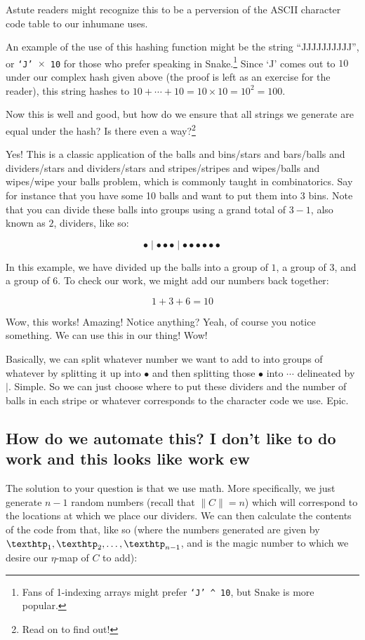 \documentclass{article}
\newcommand{\M}{\rotatebox[origin=c]{180}{\textwon}}
\begin{document}
\begin{multicols}{2}
Astute readers might recognize this to be a perversion of the ASCII character code table to our inhumane uses.

	An example of the use of this hashing function might be the string ``JJJJJJJJJJ'', or \texttt{`J' $\times$ 10} for those who prefer speaking in Snake.\footnote{Fans of 1-indexing arrays might prefer \texttt{`J' \textasciicircum \hspace{0.25em} 10}, but Snake is more popular.} Since `J' comes out to $10$ under our complex hash given above (the proof is left as an exercise for the reader), this string hashes to $10 + \cdots + 10 = 10 \times 10 = 10^2 = 100$. 

Now this is well and good, but how do we ensure that all strings we generate are equal under the hash? Is there even a way?\footnote{Read on to find out!} 

Yes! This is a classic application of the balls and bins/stars and bars/balls and dividers/stars and dividers/stars and stripes/stripes and wipes/balls and wipes/wipe your balls problem, which is commonly taught in combinatorics. Say for instance that you have some 10 balls and want to put them into 3 bins. Note that you can divide these balls into groups using a grand total of $3-1$, also known as $2$, dividers, like so:

$$\bullet \mid \bullet \bullet \bullet \mid \bullet \bullet \bullet \bullet \bullet \bullet$$

In this example, we have divided up the balls into a group of $1$, a group of $3$, and a group of $6$. To check our work, we might add our numbers back together:

$$1 + 3 + 6 = 10$$

Wow, this works! Amazing! Notice anything? Yeah, of course you notice something. We can use this in our thing! Wow!

Basically, we can split whatever number we want to add to into groups of whatever by splitting it up into $\bullet$ and then splitting those $\bullet$ into $\cdots$ delineated by $\mid$. Simple. So we can just choose where to put these dividers and the number of balls in each stripe or whatever corresponds to the character code we use. Epic.

\subsection{How do we automate this? I don't like to do work and this looks like work ew}

	The solution to your question is that we use math. More specifically, we just generate $n-1$ random numbers (recall that $\lVert C \rVert = n$) which will correspond to the locations at which we place our dividers. We can then calculate the contents of the code from that, like so (where the numbers generated are given by $\text{\texthtp}_1, \text{\texthtp}_2, \dots, \text{\texthtp}_{n-1}$, and \M \hspace{0.5em} is the magic number to which we desire our $\eta$-map of $C$ to add):


\end{multicols}
\end{document}

